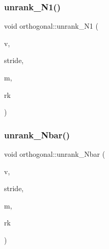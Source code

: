 \subsubsection{\texorpdfstring{unrank\+\_\+\+N1()}{unrank\_N1()}}
{\footnotesize\ttfamily void orthogonal\+::unrank\+\_\+\+N1 (\begin{DoxyParamCaption}\item[{\mbox{\hyperlink{galois_8h_a09fddde158a3a20bd2dcadb609de11dc}{I\+NT}} $\ast$}]{v,  }\item[{\mbox{\hyperlink{galois_8h_a09fddde158a3a20bd2dcadb609de11dc}{I\+NT}}}]{stride,  }\item[{\mbox{\hyperlink{galois_8h_a09fddde158a3a20bd2dcadb609de11dc}{I\+NT}}}]{m,  }\item[{\mbox{\hyperlink{galois_8h_a09fddde158a3a20bd2dcadb609de11dc}{I\+NT}}}]{rk }\end{DoxyParamCaption})}

\mbox{\label{classorthogonal_a4cfca7c6f1b38bcca49e7739c8730719}} 
\subsubsection{\texorpdfstring{unrank\+\_\+\+Nbar()}{unrank\_Nbar()}}
{\footnotesize\ttfamily void orthogonal\+::unrank\+\_\+\+Nbar (\begin{DoxyParamCaption}\item[{\mbox{\hyperlink{galois_8h_a09fddde158a3a20bd2dcadb609de11dc}{I\+NT}} $\ast$}]{v,  }\item[{\mbox{\hyperlink{galois_8h_a09fddde158a3a20bd2dcadb609de11dc}{I\+NT}}}]{stride,  }\item[{\mbox{\hyperlink{galois_8h_a09fddde158a3a20bd2dcadb609de11dc}{I\+NT}}}]{m,  }\item[{\mbox{\hyperlink{galois_8h_a09fddde158a3a20bd2dcadb609de11dc}{I\+NT}}}]{rk }\end{DoxyParamCaption})}

\mbox{\label{classorthogonal_ab655117100f7c66c19817b84ac5ac0a0}} 
